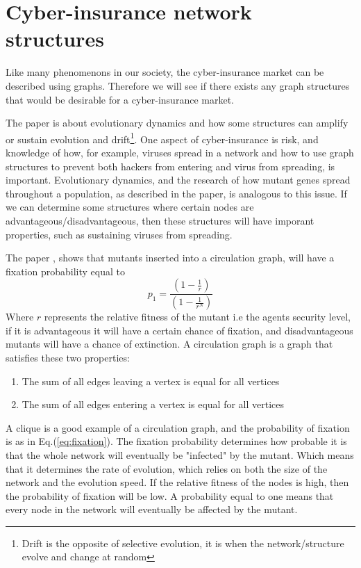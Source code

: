\section{Cyber-insurance network structures}

Like many phenomenons in our society, the cyber-insurance market can be described using graphs. Therefore we will see if there exists any graph structures that would be desirable for a cyber-insurance market.

 The paper \cite{lieberman2005evolutionary} is about evolutionary dynamics and how some structures
can amplify or sustain evolution and drift\footnote{Drift is the opposite of selective evolution, it is when the network/structure evolve and change at random}.
One aspect of cyber-insurance is risk, and knowledge of how, for example, viruses spread in a network and how to use graph structures to prevent both hackers from entering and virus from spreading, is important. Evolutionary dynamics, and the research of how mutant genes spread throughout a population, as described in the paper, is analogous to this issue.
If we can determine some structures where certain nodes are advantageous/disadvantageous, then these structures will have imporant  properties, such as sustaining viruses from spreading.

The paper \cite{lieberman2005evolutionary}, shows that mutants inserted into a circulation graph, will have a fixation probability equal to
\begin{equation}  
p_{1}=\frac{(1-\frac{1}{r})}{(1-\frac{1}{r^{N}})}
 \label{eq:fixation} 
\end{equation}
Where $r$ represents the relative fitness of the mutant i.e the agents security level, if it is advantageous it will have a certain chance of fixation, and disadvantageous mutants will have a chance of extinction. A circulation graph is a graph that satisfies these two properties: 
\begin{enumerate}
\item The sum of all edges leaving a vertex is equal for all vertices
\item The sum of all edges entering a vertex is equal for all vertices
\end{enumerate}
A clique is a good example of a circulation graph, and the probability of fixation is as in Eq.(\ref{eq:fixation}).
The fixation probability determines how probable it is that the whole network will eventually be
"infected" by the mutant. Which means that it determines the rate of evolution, which relies on both the size of the
network and the evolution speed. 
If the relative fitness of the nodes is high, then the probability of fixation will be low.
A probability equal to one means that every node in the network will eventually be affected by the mutant.

